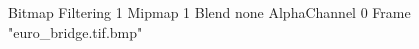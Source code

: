 {Bitmap
	{Filtering 1}
	{Mipmap 1}
	{Blend none}
	{AlphaChannel 0}
	{Frame "euro_bridge.tif.bmp"}
}
